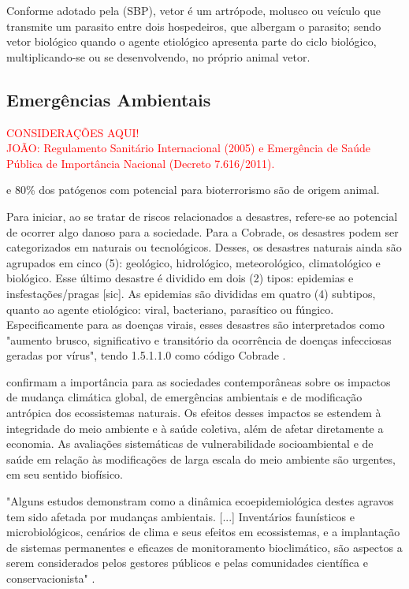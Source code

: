 \indent Conforme adotado pela  (\acrshort{SBP}), vetor é um artrópode, molusco ou veículo que transmite um parasito entre dois hospedeiros, que albergam o parasito; sendo vetor biológico quando o agente etiológico apresenta parte do ciclo biológico, multiplicando-se ou se desenvolvendo, no próprio animal vetor.

\subsection{Emergências Ambientais}

\begin{center}
\textcolor{red}{CONSIDERAÇÕES AQUI!}\\ 
\textcolor{red}{JOÃO: Regulamento Sanitário Internacional (2005) e Emergência de Saúde Pública de Importância Nacional (Decreto 7.616/2011).}
\end{center}

\indent e 80\% dos patógenos com potencial para bioterrorismo são de origem animal. 

\indent Para iniciar, ao se tratar de riscos relacionados a desastres, refere-se ao
potencial de ocorrer algo danoso para a sociedade. Para a \acrfull{Cobrade}, os desastres podem ser categorizados em naturais ou tecnológicos. Desses, os desastres naturais ainda são agrupados em cinco (5): geológico, hidrológico, meteorológico, climatológico e biológico. Esse último desastre é dividido em dois (2) tipos: epidemias e insfestações/pragas [sic]. As epidemias são divididas em quatro (4) subtipos,  quanto ao agente etiológico: viral, bacteriano, parasítico ou fúngico. Especificamente para as doenças virais, esses desastres são interpretados como "aumento brusco, significativo e transitório da ocorrência de doenças infecciosas geradas por vírus", tendo 1.5.1.1.0 como código \acrshort{Cobrade} \cite{GIRD}.

\indent {} confirmam a importância para as sociedades contemporâneas sobre os impactos de mudança climática global, de emergências ambientais e de modificação antrópica dos ecossistemas naturais. Os efeitos desses impactos se estendem à integridade do meio ambiente e à saúde coletiva, além de afetar diretamente a economia. As avaliações sistemáticas de vulnerabilidade socioambiental e de saúde em relação às modificações de larga escala do meio ambiente são urgentes, em seu sentido biofísico. 

\begin{citacao}
"Alguns estudos demonstram como a dinâmica ecoepidemiológica destes agravos tem sido afetada por mudanças ambientais. [...] Inventários faunísticos e microbiológicos, cenários de clima e seus efeitos em ecossistemas, e a implantação de sistemas permanentes e eficazes de monitoramento bioclimático, são aspectos a serem considerados pelos gestores públicos e pelas comunidades científica e conservacionista" \cite[pg-2325]{Cubas2014Tratado}.
\end{citacao}

